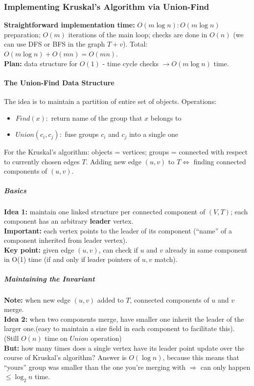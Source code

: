 \documentclass{scrartcl}
\begin{document}
\subsubsection{Implementing Kruskal's Algorithm via Union-Find}
\label{sec:6-3} {\bf Straightforward implementation time:} $O(m \log n) : O(m
\log n)$ preparation; $O(m)$ iterations of the main loop; checks are done in
$O(n)$ (we
can use DFS or BFS in the graph $T + v$). Total: $O(m \log n) + O(mn) = O(mn)$.\\
{\bf Plan: } data structure for $O(1)$ - time cycle checks $\rightarrow O(m \log
n)$ time.
\paragraph{The Union-Find Data Structure}
The idea is to maintain a partition of entire set of objects. Operations:\\
\begin{itemize}
\item $Find(x):$ return name of the group that $x$ belongs to
\item $Union(c_i, c_j):$ fuse groups $c_i$ and $c_j$ into a single one
\end{itemize}
For the Kruskal's algorithm: objects = vertices; groups = connected with respect
to currently chosen edges $T$. Adding new edge $(u, v)$ to $T \Leftrightarrow $
finding connected components of $(u, v)$.

\subparagraph{Basics} {\bf Idea 1: } maintain one linked structure per connected
component of $(V,
T)$; each component has an arbitrary {\bf leader } vertex. \\
{\bf Important: } each vertex points to the leader of its component (``name'' of
a component inherited from leader vertex).\\
{\bf Key point: } given edge $(u, v)$, can check if $u$ and $v$ already in same
component in O(1) time (if and only if leader pointers of $u, v$ match).

\subparagraph{Maintaining the Invariant } {\bf Note: } when new edge $(u, v)$
added to $T$, connected components of $u$
and $v$ merge. \\
{\bf Idea 2: } when two components merge, have smaller one inherit the leader of
the larger one.(easy to maintain a size field in each component to facilitate
this). (Still $O(n)$ time on $Union$ operation) \\
{\bf But: } how many times does a single vertex have its leader point update
over the course of Kruskal's algorithm? Answer is $O(\log n)$, because this
means that ``yours'' group was smaller than the one you're merging with
$\Rightarrow $ can only happen $\leq \log_2 n$ time.
\end{document}
